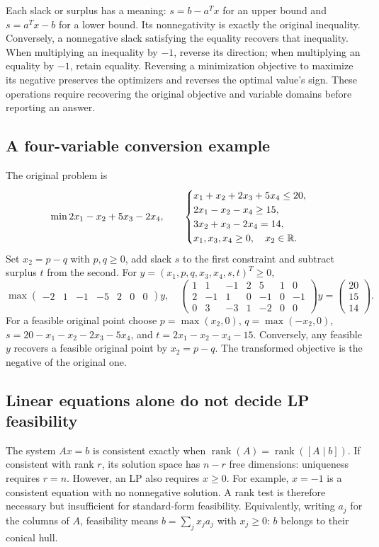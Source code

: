 \documentclass[11pt,a4paper]{article}
\begin{document}
Each slack or surplus has a meaning: $s=b-a^Tx$ for an upper bound and
$s=a^Tx-b$ for a lower bound. Its nonnegativity is exactly the original
inequality. Conversely, a nonnegative slack satisfying the equality recovers
that inequality. When multiplying an inequality by $-1$, reverse its direction;
when multiplying an equality by $-1$, retain equality. Reversing a minimization
objective to maximize its negative preserves the optimizers and reverses the
optimal value's sign. These operations require recovering the original objective
and variable domains before reporting an answer.

\subsection{A four-variable conversion example}
The original problem is
\[
  \min 2x_1-x_2+5x_3-2x_4,\qquad
  \begin{cases}
    x_1+x_2+2x_3+5x_4\leq20, \\
    2x_1-x_2-x_4\geq15,      \\
    3x_2+x_3-2x_4=14,        \\
    x_1,x_3,x_4\geq0,\quad x_2\in\mathbb{R}.
  \end{cases}
\]
Set $x_2=p-q$ with $p,q\geq0$, add slack $s$ to the first constraint and
subtract surplus $t$ from the second. For $y=(x_1,p,q,x_3,x_4,s,t)^T\geq0$,
\[
  \max\begin{pmatrix}-2&1&-1&-5&2&0&0\end{pmatrix}y,
  \quad
  \begin{pmatrix}
    1&1&-1&2&5&1&0\\
    2&-1&1&0&-1&0&-1\\
    0&3&-3&1&-2&0&0
  \end{pmatrix}y=
  \begin{pmatrix}20\\15\\14\end{pmatrix}.
\]
For a feasible original point choose $p=\max(x_2,0)$, $q=\max(-x_2,0)$,
$s=20-x_1-x_2-2x_3-5x_4$, and $t=2x_1-x_2-x_4-15$.
Conversely, any feasible $y$ recovers a feasible original point by $x_2=p-q$.
The transformed objective is the negative of the original one.

\subsection{Linear equations alone do not decide LP feasibility}
The system $Ax=b$ is consistent exactly when
$\operatorname{rank}(A)=\operatorname{rank}([A\mid b])$.
If consistent with rank $r$, its solution space has $n-r$ free dimensions:
uniqueness requires $r=n$. However, an LP also requires $x\geq0$.
For example, $x=-1$ is a consistent equation with no nonnegative solution.
A rank test is therefore necessary but insufficient for standard-form feasibility.
Equivalently, writing $a_j$ for the columns of $A$, feasibility means
$b=\sum_jx_ja_j$ with $x_j\geq0$: $b$ belongs to their conical hull.
\end{document}
